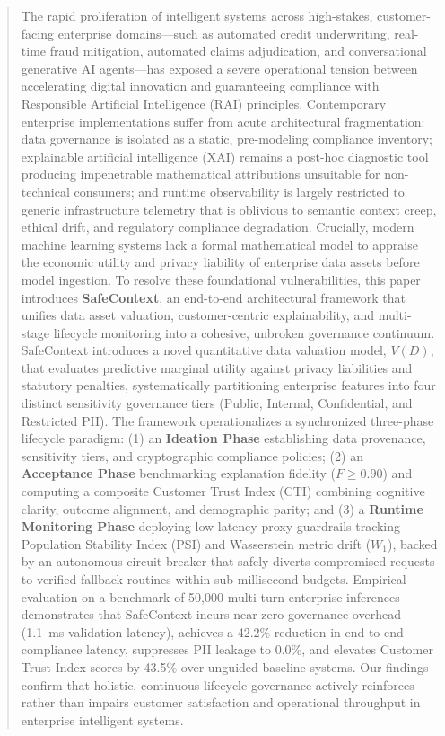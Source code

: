 \documentclass[journal]{IEEEtran}
\begin{document}
\begin{abstract}
The rapid proliferation of intelligent systems across high-stakes, customer-facing enterprise domains---such as automated credit underwriting, real-time fraud mitigation, automated claims adjudication, and conversational generative AI agents---has exposed a severe operational tension between accelerating digital innovation and guaranteeing compliance with Responsible Artificial Intelligence (RAI) principles. Contemporary enterprise implementations suffer from acute architectural fragmentation: data governance is isolated as a static, pre-modeling compliance inventory; explainable artificial intelligence (XAI) remains a post-hoc diagnostic tool producing impenetrable mathematical attributions unsuitable for non-technical consumers; and runtime observability is largely restricted to generic infrastructure telemetry that is oblivious to semantic context creep, ethical drift, and regulatory compliance degradation. Crucially, modern machine learning systems lack a formal mathematical model to appraise the economic utility and privacy liability of enterprise data assets before model ingestion. To resolve these foundational vulnerabilities, this paper introduces \textbf{SafeContext}, an end-to-end architectural framework that unifies data asset valuation, customer-centric explainability, and multi-stage lifecycle monitoring into a cohesive, unbroken governance continuum. SafeContext introduces a novel quantitative data valuation model, $V(D)$, that evaluates predictive marginal utility against privacy liabilities and statutory penalties, systematically partitioning enterprise features into four distinct sensitivity governance tiers (Public, Internal, Confidential, and Restricted PII). The framework operationalizes a synchronized three-phase lifecycle paradigm: (1) an \textbf{Ideation Phase} establishing data provenance, sensitivity tiers, and cryptographic compliance policies; (2) an \textbf{Acceptance Phase} benchmarking explanation fidelity ($F \ge 0.90$) and computing a composite Customer Trust Index (CTI) combining cognitive clarity, outcome alignment, and demographic parity; and (3) a \textbf{Runtime Monitoring Phase} deploying low-latency proxy guardrails tracking Population Stability Index (PSI) and Wasserstein metric drift ($W_1$), backed by an autonomous circuit breaker that safely diverts compromised requests to verified fallback routines within sub-millisecond budgets. Empirical evaluation on a benchmark of 50,000 multi-turn enterprise inferences demonstrates that SafeContext incurs near-zero governance overhead (1.1~ms validation latency), achieves a 42.2\% reduction in end-to-end compliance latency, suppresses PII leakage to 0.0\%, and elevates Customer Trust Index scores by 43.5\% over unguided baseline systems. Our findings confirm that holistic, continuous lifecycle governance actively reinforces rather than impairs customer satisfaction and operational throughput in enterprise intelligent systems.
\end{abstract}
\end{document}

